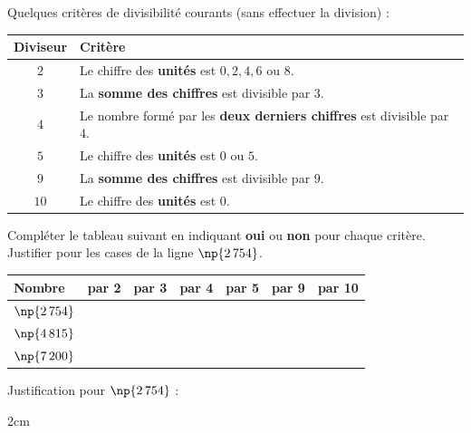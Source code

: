 \documentclass[a4paper]{book}
\begin{document}
    \begin{propriete}
        Quelques critères de divisibilité courants (sans effectuer la division) :

        \medskip
        \begin{center}
        \renewcommand{\arraystretch}{1.8}
        \begin{tabular}{|c|p{9cm}|}
        \hline
        \textbf{Diviseur} & \textbf{Critère} \\ \hline
        $2$  & Le chiffre des \textbf{unités} est $0, 2, 4, 6$ ou $8$. \\ \hline
        $3$  & La \textbf{somme des chiffres} est divisible par $3$. \\ \hline
        $4$  & Le nombre formé par les \textbf{deux derniers chiffres} est divisible par $4$. \\ \hline
        $5$  & Le chiffre des \textbf{unités} est $0$ ou $5$. \\ \hline
        $9$  & La \textbf{somme des chiffres} est divisible par $9$. \\ \hline
        $10$ & Le chiffre des \textbf{unités} est $0$. \\ \hline
        \end{tabular}
        \end{center}
    \end{propriete}

    \begin{exemple}
        Compléter le tableau suivant en indiquant \textbf{oui} ou \textbf{non} pour chaque critère. Justifier pour les cases de la ligne $\np{2\,754}$.

        \medskip
        \begin{center}
        \renewcommand{\arraystretch}{2.2}
        \begin{tabular}{|l|c|c|c|c|c|c|}
        \hline
        \textbf{Nombre} & \textbf{par 2} & \textbf{par 3} & \textbf{par 4} & \textbf{par 5} & \textbf{par 9} & \textbf{par 10} \\ \hline
        $\np{2\,754}$   & \hspace{1cm}   & \hspace{1cm}   & \hspace{1cm}   & \hspace{1cm}   & \hspace{1cm}   & \hspace{1cm} \\ \hline
        $\np{4\,815}$   &                &                &                &                &                & \\ \hline
        $\np{7\,200}$   &                &                &                &                &                & \\ \hline
        \end{tabular}
        \end{center}

        \medskip
        Justification pour $\np{2\,754}$ :
        \begin{ZoneReponse}{2cm}
        \end{ZoneReponse}
    \end{exemple}
\end{document}
